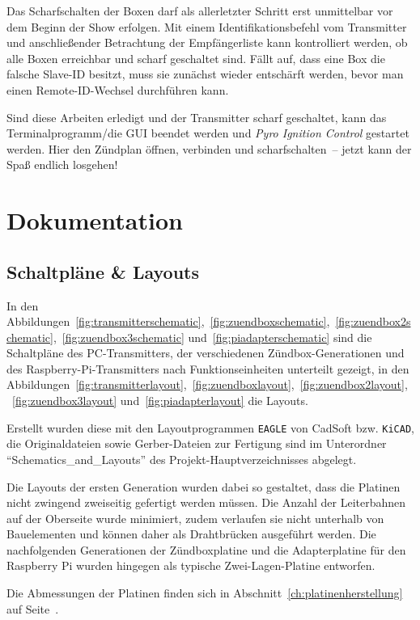 \documentclass[paper=a4, parskip, numbers=noenddot, toc=listof, headsepline]{scrbook}
\newcommand{\pic}{\emph{Pyro Ignition Control}}
\begin{document}
			Das Scharfschalten der Boxen darf als allerletzter Schritt erst unmittelbar vor dem Beginn der Show erfolgen. Mit einem Identifikationsbefehl vom Transmitter und anschließender Betrachtung der Empfängerliste kann kontrolliert werden, ob alle Boxen erreichbar und scharf geschaltet sind. Fällt auf, dass eine Box die falsche Slave-ID besitzt, muss sie zunächst wieder entschärft werden, bevor man einen Remote-ID-Wechsel durchführen kann.

			Sind diese Arbeiten erledigt und der Transmitter scharf geschaltet, kann das Terminalprogramm/die GUI beendet werden und {\pic} gestartet werden. Hier den Zündplan öffnen, verbinden und scharfschalten~-- jetzt kann der Spaß endlich losgehen!

\part{Dokumentation}
	\label{part:dokumentation}

	\chapter{Schaltpläne \& Layouts}

		In den Abbildungen~\ref{fig:transmitterschematic},~\ref{fig:zuendboxschematic},~\ref{fig:zuendbox2schematic},~\ref{fig:zuendbox3schematic} und~\ref{fig:piadapterschematic} sind die Schaltpläne des PC-Transmitters, der verschiedenen Zündbox-Generationen und des Raspberry-Pi-Transmitters nach Funk\-tions\-ein\-heiten unterteilt gezeigt, in den Abbildungen~\ref{fig:transmitterlayout},~\ref{fig:zuendboxlayout},~\ref{fig:zuendbox2layout}, ~\ref{fig:zuendbox3layout} und~\ref{fig:piadapterlayout} die Layouts.

		Erstellt wurden diese mit den Layoutprogrammen \texttt{EAGLE} von CadSoft bzw. \texttt{KiCAD}, die Originaldateien sowie Gerber-Dateien zur Fertigung sind im Unterordner \enquote{Schematics\_and\_Layouts} des Projekt-Hauptverzeichnisses abgelegt.

		Die Layouts der ersten Generation wurden dabei so gestaltet, dass die Platinen nicht zwingend zweiseitig gefertigt werden müssen. Die Anzahl der Leiterbahnen auf der Oberseite wurde minimiert, zudem verlaufen sie nicht unterhalb von Bauelementen und können daher als Drahtbrücken ausgeführt werden. Die nachfolgenden Generationen der Zündboxplatine und die Adapterplatine für den Raspberry Pi wurden hingegen als typische Zwei-Lagen-Platine entworfen.

		Die Abmessungen der Platinen finden sich in Abschnitt~\ref{ch:platinenherstellung} auf Seite~\pageref{ch:platinenherstellung}.
\end{document}
